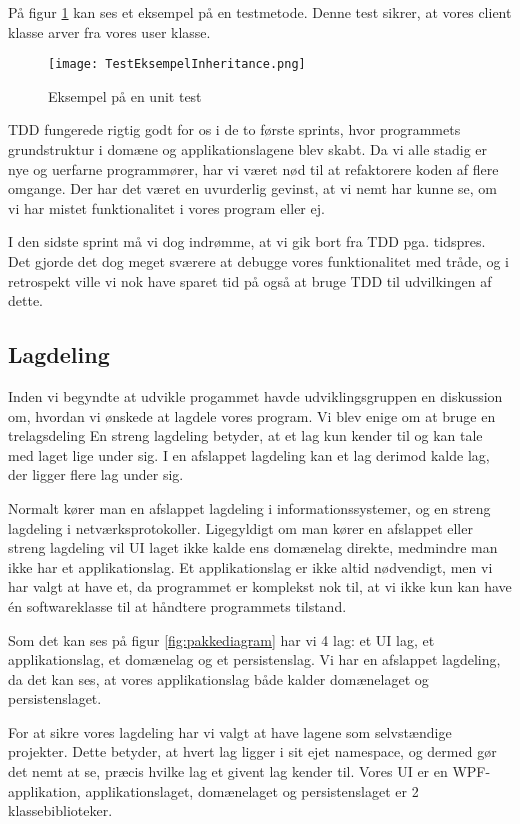 På figur \ref{fig:TDD} kan ses et eksempel på en testmetode.
Denne test sikrer, at vores client klasse arver fra vores user klasse.

\begin{figure}[H]
    \caption{Eksempel på en unit test}
    \centering
        \texttt{[image: TestEksempelInheritance.png]}
    \label{fig:TDD}
\end{figure}

TDD fungerede rigtig godt for os i de to første sprints, hvor programmets grundstruktur i domæne og applikationslagene blev skabt.
Da vi alle stadig er nye og uerfarne programmører, har vi været nød til at refaktorere koden af flere omgange.
Der har det været en uvurderlig gevinst, at vi nemt har kunne se, om vi har mistet funktionalitet i vores program eller ej.

I den sidste sprint må vi dog indrømme, at vi gik bort fra TDD pga. tidspres.
Det gjorde det dog meget sværere at debugge vores funktionalitet med tråde, og i retrospekt ville vi nok have sparet tid på også at bruge TDD til udvilkingen af dette.

\subsection{Lagdeling}
\label{lagdeling}

Inden vi begyndte at udvikle progammet havde udviklingsgruppen en diskussion om, hvordan vi ønskede at lagdele vores program.
Vi blev enige om at bruge en trelagsdeling
En streng lagdeling betyder, at et lag kun kender til og kan tale med laget lige under sig.
I en afslappet lagdeling kan et lag derimod kalde lag, der ligger flere lag under sig.\cite{larman}

Normalt kører man en afslappet lagdeling i informationssystemer, og en streng lagdeling i netværksprotokoller.
Ligegyldigt om man kører en afslappet eller streng lagdeling vil UI laget ikke kalde ens domænelag direkte, medmindre man ikke har et applikationslag.
Et applikationslag er ikke altid nødvendigt, men vi har valgt at have et, da programmet er komplekst nok til, at vi ikke kun kan have én softwareklasse til at håndtere programmets tilstand.\cite{larman}

Som det kan ses på figur \ref{fig:pakkediagram} har vi 4 lag: et UI lag, et applikationslag, et domænelag og et persistenslag.
Vi har en afslappet lagdeling, da det kan ses, at vores applikationslag både kalder domænelaget og persistenslaget.

For at sikre vores lagdeling har vi valgt at have lagene som selvstændige projekter.
Dette betyder, at hvert lag ligger i sit ejet namespace, og dermed gør det nemt at se, præcis hvilke lag et givent lag kender til.
Vores UI er en WPF-applikation, applikationslaget, domænelaget og persistenslaget er 2 klassebiblioteker.

